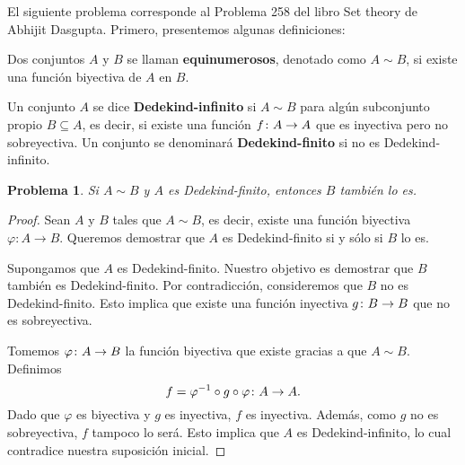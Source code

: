 \documentclass[a4,10pt]{aleph-notas}
\newtheorem*{prob}{Problema}
\begin{document}
\encabezado

\noindent
El siguiente problema corresponde al Problema 258 del libro Set theory de Abhijit Dasgupta. Primero, presentemos algunas definiciones:

\begin{defi}
    Dos conjuntos $A$ y $B$ se llaman \textbf{equinumerosos}, denotado como $A \sim B$, si existe una función biyectiva de $A$ en $B$.
\end{defi}

\begin{defi}
    Un conjunto $A$ se dice \textbf{Dedekind-infinito} si $A \sim B$ para algún subconjunto propio $B \subseteq A$, es decir, si existe una función $f\colon A \rightarrow A$ que es inyectiva pero no sobreyectiva. Un conjunto se denominará \textbf{Dedekind-finito} si no es Dedekind-infinito.
\end{defi}

\begin{prob}
    Si $A\sim B$ y $A$ es Dedekind-finito, entonces $B$ también lo es.
\end{prob}

\begin{proof}
    Sean \( A \) y \( B \) tales que \( A \sim B \), es decir, existe una función biyectiva \( \varphi: A \to B \). Queremos demostrar que \( A \) es Dedekind-finito si y sólo si \( B \) lo es.

    Supongamos que \( A \) es Dedekind-finito. Nuestro objetivo es demostrar que \( B \) también es Dedekind-finito. Por contradicción, consideremos que \( B \) no es Dedekind-finito. Esto implica que existe una función inyectiva \( g\colon B \rightarrow B \) que no es sobreyectiva. 

    Tomemos $\varphi\colon A \rightarrow B$ la función biyectiva que existe gracias a que $A\sim B$. Definimos 
    \[
        f=\varphi^{-1} \circ g \circ \varphi\colon A \rightarrow A. 
    \]
    Dado que \( \varphi \) es biyectiva y $g$ es inyectiva, \( f \) es inyectiva. Además, como \( g \) no es sobreyectiva, \( f \) tampoco lo será. Esto implica que \( A \) es Dedekind-infinito, lo cual contradice nuestra suposición inicial.

\end{proof}
    
\end{document}
